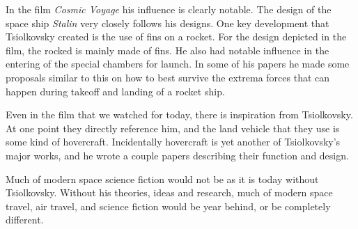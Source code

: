 \documentclass[10pt]{armath}
\begin{document}
In the film \textit{Cosmic Voyage} his influence is clearly notable. The design
of the space ship \textit{Stalin} very closely follows his designs. One key
development that Tsiolkovsky created is the use of fins on a rocket. For the
design depicted in the film, the rocked is mainly made of fins. He also had
notable influence in the entering of the special chambers for launch. In some
of his papers he made some proposals similar to this on how to best survive
the extrema forces that can happen during takeoff and landing of a rocket ship.

Even in the film that we watched for today, there is inspiration from
Tsiolkovsky. At one point they directly reference him, and the land vehicle
that they use is some kind of hovercraft. Incidentally hovercraft is yet another
of Tsiolkovsky's major works, and he wrote a couple papers describing their
function and design.

Much of modern space science fiction would not be as it is today without
Tsiolkovsky. Without his theories, ideas and research, much of modern space
travel, air travel, and science fiction would be year behind, or be completely
different.

\nocite{*}
\printbibliography{}
\end{document}

